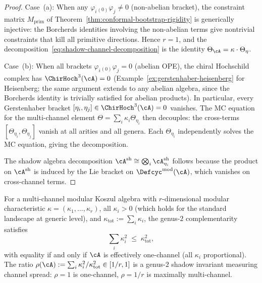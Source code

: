 \begin{proof}
Case~(a): When any $\varphi_i{}_{(0)}\varphi_j \neq 0$ (non-abelian
bracket), the constraint matrix $M_{\mathrm{prim}}$ of
Theorem~\ref{thm:conformal-bootstrap-rigidity} is generically
injective: the Borcherds identities involving the non-abelian terms
give nontrivial constraints that kill all primitive directions.  Hence
$r = 1$, and the decomposition~\eqref{eq:shadow-channel-decomposition}
is the identity $\Theta_\cA = \kappa \cdot \Theta_\eta$.

\smallskip
Case~(b): When all brackets $\varphi_i{}_{(0)}\varphi_j = 0$
(abelian OPE), the chiral Hochschild complex has
$\ChirHoch^3(\cA) = 0$
(Example~\ref{ex:gerstenhaber-heisenberg} for Heisenberg; the same
argument extends to any abelian algebra, since the Borcherds identity
is trivially satisfied for abelian products).  In particular, every
Gerstenhaber bracket $[\eta_i, \eta_j] \in \ChirHoch^3(\cA) = 0$
vanishes.  The MC equation for the multi-channel element
$\Theta = \sum_i \kappa_i \Theta_{\eta_i}$ then decouples:
the cross-terms $[\Theta_{\eta_i}, \Theta_{\eta_j}]$ vanish at all
arities and all genera.  Each $\Theta_{\eta_i}$ independently solves
the MC equation, giving the decomposition.

The shadow algebra decomposition
$\cA^{\mathrm{sh}} \cong \bigotimes_i \cA^{\mathrm{sh}}_{\eta_i}$
follows because the product on $\cA^{\mathrm{sh}}$
is induced by the Lie bracket on $\Defcyc^{\mathrm{mod}}(\cA)$,
which vanishes on cross-channel terms.
\end{proof}

\begin{corollary}
\label{cor:shadow-cauchy-schwarz}
For a multi-channel modular Koszul algebra with
$r$-dimensional modular characteristic
$\kappa = (\kappa_1, \ldots, \kappa_r)$,
all $\kappa_i > 0$ \textup{(}which holds for the standard
landscape at generic level\textup{)}, and
$\kappa_{\mathrm{tot}} := \sum_i \kappa_i$, the genus-$2$
complementarity satisfies
\begin{equation}\label{eq:shadow-cs}
\sum_i \kappa_i^2 \;\leq\; \kappa_{\mathrm{tot}}^2,
\end{equation}
with equality if and only if\/ $\cA$ is effectively one-channel
\textup{(}all $\kappa_i$ proportional\textup{)}.  The ratio
$\rho(\cA) := \sum_i \kappa_i^2 / \kappa_{\mathrm{tot}}^2
\in [1/r, 1]$
is a genus-$2$ shadow invariant measuring channel spread: $\rho = 1$
is one-channel, $\rho = 1/r$ is maximally multi-channel.
\end{corollary}

